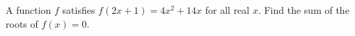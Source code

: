 A function $f$ satisfies $f(2x+1)=4x^2+14x$ for all real $x$. Find the sum of the roots of $f(x)=0$.
